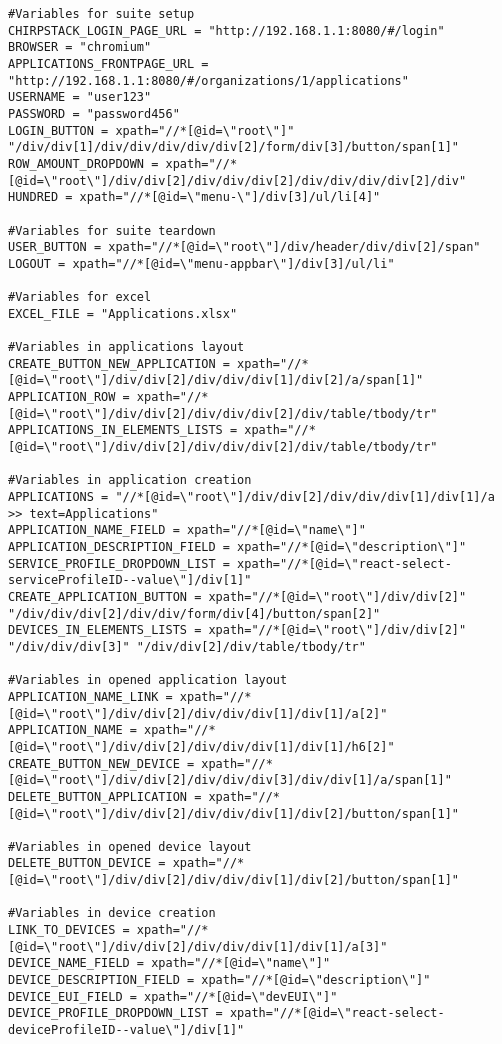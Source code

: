 \begin{verbatim}
#Variables for suite setup
CHIRPSTACK_LOGIN_PAGE_URL = "http://192.168.1.1:8080/#/login"
BROWSER = "chromium"
APPLICATIONS_FRONTPAGE_URL = "http://192.168.1.1:8080/#/organizations/1/applications"
USERNAME = "user123"
PASSWORD = "password456"
LOGIN_BUTTON = xpath="//*[@id=\"root\"]" "/div/div[1]/div/div/div/div/div[2]/form/div[3]/button/span[1]"
ROW_AMOUNT_DROPDOWN = xpath="//*[@id=\"root\"]/div/div[2]/div/div/div[2]/div/div/div/div[2]/div"
HUNDRED = xpath="//*[@id=\"menu-\"]/div[3]/ul/li[4]"

#Variables for suite teardown
USER_BUTTON = xpath="//*[@id=\"root\"]/div/header/div/div[2]/span"
LOGOUT = xpath="//*[@id=\"menu-appbar\"]/div[3]/ul/li"

#Variables for excel
EXCEL_FILE = "Applications.xlsx"

#Variables in applications layout
CREATE_BUTTON_NEW_APPLICATION = xpath="//*[@id=\"root\"]/div/div[2]/div/div/div[1]/div[2]/a/span[1]"
APPLICATION_ROW = xpath="//*[@id=\"root\"]/div/div[2]/div/div/div[2]/div/table/tbody/tr"
APPLICATIONS_IN_ELEMENTS_LISTS = xpath="//*[@id=\"root\"]/div/div[2]/div/div/div[2]/div/table/tbody/tr"

#Variables in application creation
APPLICATIONS = "//*[@id=\"root\"]/div/div[2]/div/div/div[1]/div[1]/a >> text=Applications"
APPLICATION_NAME_FIELD = xpath="//*[@id=\"name\"]"
APPLICATION_DESCRIPTION_FIELD = xpath="//*[@id=\"description\"]"
SERVICE_PROFILE_DROPDOWN_LIST = xpath="//*[@id=\"react-select-serviceProfileID--value\"]/div[1]"
CREATE_APPLICATION_BUTTON = xpath="//*[@id=\"root\"]/div/div[2]" "/div/div/div[2]/div/div/form/div[4]/button/span[2]"
DEVICES_IN_ELEMENTS_LISTS = xpath="//*[@id=\"root\"]/div/div[2]" "/div/div/div[3]" "/div/div[2]/div/table/tbody/tr"

#Variables in opened application layout
APPLICATION_NAME_LINK = xpath="//*[@id=\"root\"]/div/div[2]/div/div/div[1]/div[1]/a[2]"
APPLICATION_NAME = xpath="//*[@id=\"root\"]/div/div[2]/div/div/div[1]/div[1]/h6[2]"
CREATE_BUTTON_NEW_DEVICE = xpath="//*[@id=\"root\"]/div/div[2]/div/div/div[3]/div/div[1]/a/span[1]"
DELETE_BUTTON_APPLICATION = xpath="//*[@id=\"root\"]/div/div[2]/div/div/div[1]/div[2]/button/span[1]"

#Variables in opened device layout
DELETE_BUTTON_DEVICE = xpath="//*[@id=\"root\"]/div/div[2]/div/div/div[1]/div[2]/button/span[1]"

#Variables in device creation
LINK_TO_DEVICES = xpath="//*[@id=\"root\"]/div/div[2]/div/div/div[1]/div[1]/a[3]"
DEVICE_NAME_FIELD = xpath="//*[@id=\"name\"]"
DEVICE_DESCRIPTION_FIELD = xpath="//*[@id=\"description\"]"
DEVICE_EUI_FIELD = xpath="//*[@id=\"devEUI\"]"
DEVICE_PROFILE_DROPDOWN_LIST = xpath="//*[@id=\"react-select-deviceProfileID--value\"]/div[1]"


\end{verbatim}
